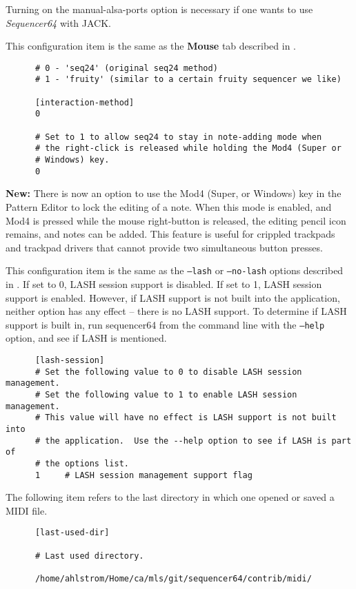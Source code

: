    Turning on the manual-alsa-ports option is necessary if one
   wants to use \textsl{Sequencer64} with JACK.

   This configuration item is the same as the 
   \textbf{Mouse} tab described in
   .

   \begin{verbatim}
      # 0 - 'seq24' (original seq24 method)
      # 1 - 'fruity' (similar to a certain fruity sequencer we like)

      [interaction-method]
      0

      # Set to 1 to allow seq24 to stay in note-adding mode when
      # the right-click is released while holding the Mod4 (Super or
      # Windows) key.
      0
   \end{verbatim}

   \textbf{New:}
   There is now an option to use the Mod4 (Super, or Windows) key in the
   Pattern Editor to lock the editing of a note.  When this mode is enabled,
   and Mod4 is pressed while the mouse right-button is released, the
   editing pencil icon remains, and notes can be added.  This feature is
   useful for crippled trackpads and trackpad drivers that cannot provide
   two simultaneous button presses.

   This configuration item is the same as the
   \texttt{--lash} or \texttt{--no-lash} options described in
   .
   If set to 0, LASH session support is disabled.
   If set to 1, LASH session support is enabled.
   However, if LASH support is not built into the application, neither option
   has any effect -- there is no LASH support.  
   To determine if LASH support is built in, run sequencer64 from the command
   line with the \texttt{--help} option, and see if LASH is mentioned.

   \begin{verbatim}
      [lash-session]
      # Set the following value to 0 to disable LASH session management.
      # Set the following value to 1 to enable LASH session management.
      # This value will have no effect is LASH support is not built into
      # the application.  Use the --help option to see if LASH is part of
      # the options list.
      1     # LASH session management support flag
   \end{verbatim}

   The following item refers to the last directory in which one opened or
   saved a MIDI file.

   \begin{verbatim}
      [last-used-dir]

      # Last used directory.

      /home/ahlstrom/Home/ca/mls/git/sequencer64/contrib/midi/
   \end{verbatim}

